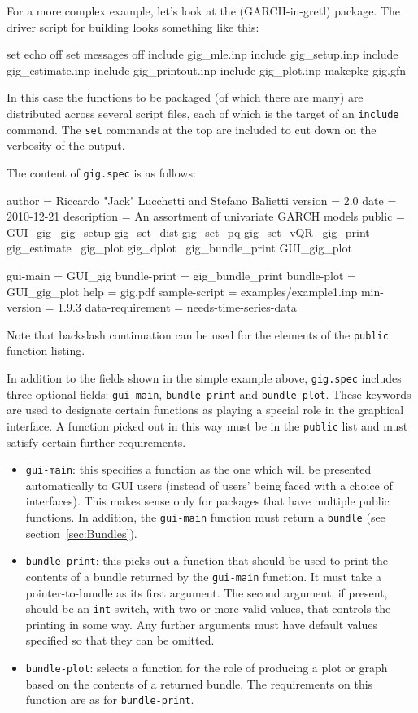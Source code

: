 For a more complex example, let's look at the 
(GARCH-in-gretl) package.  The driver script for building 
looks something like this:
%
\begin{code}
set echo off
set messages off
include gig_mle.inp
include gig_setup.inp
include gig_estimate.inp
include gig_printout.inp
include gig_plot.inp
makepkg gig.gfn
\end{code}

In this case the functions to be packaged (of which there are many)
are distributed across several script files, each of which is the
target of an \texttt{include} command.  The \texttt{set} commands at
the top are included to cut down on the verbosity of the output.

The content of \texttt{gig.spec} is as follows:
%
\begin{code}
author = Riccardo "Jack" Lucchetti and Stefano Balietti
version = 2.0
date = 2010-12-21
description = An assortment of univariate GARCH models
public = GUI_gig \
    gig_setup gig_set_dist gig_set_pq gig_set_vQR \
    gig_print gig_estimate \
    gig_plot gig_dplot \
    gig_bundle_print GUI_gig_plot

gui-main = GUI_gig
bundle-print = gig_bundle_print
bundle-plot = GUI_gig_plot
help = gig.pdf
sample-script = examples/example1.inp
min-version = 1.9.3
data-requirement = needs-time-series-data
\end{code}

Note that backslash continuation can be used for the elements of the
\texttt{public} function listing.

In addition to the fields shown in the simple example above,
\texttt{gig.spec} includes three optional fields: \texttt{gui-main},
\texttt{bundle-print} and \texttt{bundle-plot}. These keywords are
used to designate certain functions as playing a special role in the
\app{gretl} graphical interface. A function picked out in this way
must be in the \texttt{public} list and must satisfy certain
further requirements.  
%
\begin{itemize}
\item \texttt{gui-main}: this specifies a function as the one which
  will be presented automatically to GUI users (instead of users'
  being faced with a choice of interfaces). This makes sense only for
  packages that have multiple public functions. In addition, the
  \texttt{gui-main} function must return a \texttt{bundle} (see
  section~\ref{sec:Bundles}).
\item \texttt{bundle-print}: this picks out a function that should be
  used to print the contents of a bundle returned by the
  \texttt{gui-main} function. It must take a pointer-to-bundle as its
  first argument. The second argument, if present, should be an
  \texttt{int} switch, with two or more valid values, that controls the
  printing in some way. Any further arguments must have default values
  specified so that they can be omitted.
\item \texttt{bundle-plot}: selects a function for the role of
  producing a plot or graph based on the contents of a returned
  bundle. The requirements on this function are as for 
  \texttt{bundle-print}.
\end{itemize}

